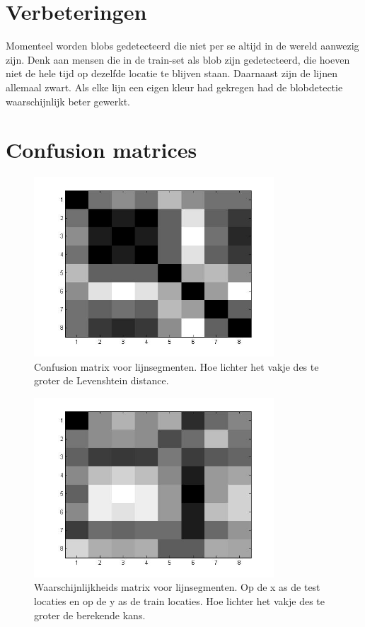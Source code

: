 \documentclass[a4paper]{article}
\begin{document}
\section{Verbeteringen}
Momenteel worden blobs gedetecteerd die niet per se altijd in de wereld aanwezig zijn. Denk aan mensen die in de train-set als blob zijn gedetecteerd, die hoeven niet de hele tijd op dezelfde locatie te blijven staan. Daarnaast zijn de lijnen allemaal zwart. Als elke lijn een eigen kleur had gekregen had de blobdetectie waarschijnlijk beter gewerkt.

\section{Confusion matrices}

\begin{figure}[h]
	\centering
	\includegraphics[width=0.8\textwidth]{confusion_line.jpg}
	\caption{Confusion matrix voor lijnsegmenten. Hoe lichter het vakje des te groter de Levenshtein distance.}
	\label{fig:confusion_line}
\end{figure}

\begin{figure}[h]
	\centering
	\includegraphics[width=0.8\textwidth]{line_prob.jpg}
	\caption{Waarschijnlijkheids matrix voor lijnsegmenten. Op de x as de test locaties en op de y as de train locaties. Hoe lichter het vakje des te groter de berekende kans.}
	\label{fig:line_prob}
\end{figure}
\end{document}
